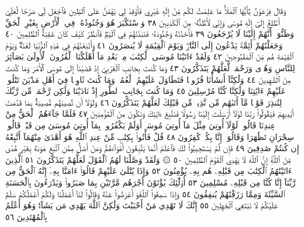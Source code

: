 وَقَالَ فِرْعَوْنُ يَٰٓأَيُّهَا ٱلْمَلَأُ مَا عَلِمْتُ لَكُم مِّنْ إِلَٰهٍ
غَيْرِي فَأَوْقِدْ لِي يَٰهَٰمَٰنُ عَلَى ٱلطِّينِ فَٱجْعَل لِّي صَرْحࣰا لَّعَلِّيٓ
أَطَّلِعُ إِلَىٰٓ إِلَٰهِ مُوسَىٰ وَإِنِّي لَأَظُنُّهُۥ مِنَ ٱلْكَٰذِبِينَ ٣٨
وَٱسْتَكْبَرَ هُوَ وَجُنُودُهُۥ فِي ٱلْأَرْضِ بِغَيْرِ ٱلْحَقِّ وَظَنُّوٓا۟
أَنَّهُمْ إِلَيْنَا لَا يُرْجَعُونَ ٣٩ فَأَخَذْنَٰهُ وَجُنُودَهُۥ فَنَبَذْنَٰهُمْ
فِي ٱلْيَمِّۖ فَٱنظُرْ كَيْفَ كَانَ عَٰقِبَةُ ٱلظَّٰلِمِينَ ٤٠
وَجَعَلْنَٰهُمْ أَئِمَّةࣰ يَدْعُونَ إِلَى ٱلنَّارِۖ وَيَوْمَ ٱلْقِيَٰمَةِ
لَا يُنصَرُونَ ٤١ وَأَتْبَعْنَٰهُمْ فِي هَٰذِهِ ٱلدُّنْيَا لَعْنَةࣰۖ
وَيَوْمَ ٱلْقِيَٰمَةِ هُم مِّنَ ٱلْمَقْبُوحِينَ ٤٢ وَلَقَدْ ءَاتَيْنَا
مُوسَى ٱلْكِتَٰبَ مِنۢ بَعْدِ مَآ أَهْلَكْنَا ٱلْقُرُونَ ٱلْأُولَىٰ
بَصَآئِرَ لِلنَّاسِ وَهُدࣰى وَرَحْمَةࣰ لَّعَلَّهُمْ يَتَذَكَّرُونَ ٤٣
وَمَا كُنتَ بِجَانِبِ ٱلْغَرْبِيِّ إِذْ قَضَيْنَآ إِلَىٰ مُوسَى ٱلْأَمْرَ وَمَا كُنتَ
مِنَ ٱلشَّٰهِدِينَ ٤٤ وَلَٰكِنَّآ أَنشَأْنَا قُرُونࣰا فَتَطَاوَلَ عَلَيْهِمُ
ٱلْعُمُرُۚ وَمَا كُنتَ ثَاوِيࣰا فِيٓ أَهْلِ مَدْيَنَ تَتْلُوا۟ عَلَيْهِمْ
ءَايَٰتِنَا وَلَٰكِنَّا كُنَّا مُرْسِلِينَ ٤٥ وَمَا كُنتَ بِجَانِبِ
ٱلطُّورِ إِذْ نَادَيْنَا وَلَٰكِن رَّحْمَةࣰ مِّن رَّبِّكَ لِتُنذِرَ قَوْمࣰا
مَّآ أَتَىٰهُم مِّن نَّذِيرࣲ مِّن قَبْلِكَ لَعَلَّهُمْ يَتَذَكَّرُونَ ٤٦
وَلَوْلَآ أَن تُصِيبَهُم مُّصِيبَةُۢ بِمَا قَدَّمَتْ أَيْدِيهِمْ فَيَقُولُوا۟
رَبَّنَا لَوْلَآ أَرْسَلْتَ إِلَيْنَا رَسُولࣰا فَنَتَّبِعَ ءَايَٰتِكَ وَنَكُونَ
مِنَ ٱلْمُؤْمِنِينَ ٤٧ فَلَمَّا جَآءَهُمُ ٱلْحَقُّ مِنْ عِندِنَا قَالُوا۟
لَوْلَآ أُوتِيَ مِثْلَ مَآ أُوتِيَ مُوسَىٰٓۚ أَوَلَمْ يَكْفُرُوا۟ بِمَآ أُوتِيَ
مُوسَىٰ مِن قَبْلُۖ قَالُوا۟ سِحْرَانِ تَظَٰهَرَا وَقَالُوٓا۟ إِنَّا بِكُلࣲّ كَٰفِرُونَ ٤٨
قُلْ فَأْتُوا۟ بِكِتَٰبࣲ مِّنْ عِندِ ٱللَّهِ هُوَ أَهْدَىٰ مِنْهُمَآ أَتَّبِعْهُ
إِن كُنتُمْ صَٰدِقِينَ ٤٩ فَإِن لَّمْ يَسْتَجِيبُوا۟ لَكَ فَٱعْلَمْ
أَنَّمَا يَتَّبِعُونَ أَهْوَآءَهُمْۚ وَمَنْ أَضَلُّ مِمَّنِ ٱتَّبَعَ هَوَىٰهُ بِغَيْرِ
هُدࣰى مِّنَ ٱللَّهِۚ إِنَّ ٱللَّهَ لَا يَهْدِي ٱلْقَوْمَ ٱلظَّٰلِمِينَ ٥٠
۞ وَلَقَدْ وَصَّلْنَا لَهُمُ ٱلْقَوْلَ لَعَلَّهُمْ يَتَذَكَّرُونَ ٥١ ٱلَّذِينَ
ءَاتَيْنَٰهُمُ ٱلْكِتَٰبَ مِن قَبْلِهِۦ هُم بِهِۦ يُؤْمِنُونَ ٥٢ وَإِذَا يُتْلَىٰ
عَلَيْهِمْ قَالُوٓا۟ ءَامَنَّا بِهِۦٓ إِنَّهُ ٱلْحَقُّ مِن رَّبِّنَآ إِنَّا كُنَّا مِن قَبْلِهِۦ
مُسْلِمِينَ ٥٣ أُو۟لَٰٓئِكَ يُؤْتَوْنَ أَجْرَهُم مَّرَّتَيْنِ بِمَا صَبَرُوا۟ وَيَدْرَءُونَ
بِٱلْحَسَنَةِ ٱلسَّيِّئَةَ وَمِمَّا رَزَقْنَٰهُمْ يُنفِقُونَ ٥٤ وَإِذَا سَمِعُوا۟
ٱللَّغْوَ أَعْرَضُوا۟ عَنْهُ وَقَالُوا۟ لَنَآ أَعْمَٰلُنَا وَلَكُمْ أَعْمَٰلُكُمْ سَلَٰمٌ
عَلَيْكُمْ لَا نَبْتَغِي ٱلْجَٰهِلِينَ ٥٥ إِنَّكَ لَا تَهْدِي مَنْ أَحْبَبْتَ
وَلَٰكِنَّ ٱللَّهَ يَهْدِي مَن يَشَآءُۚ وَهُوَ أَعْلَمُ بِٱلْمُهْتَدِينَ ٥٦
